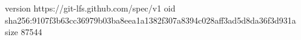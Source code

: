 version https://git-lfs.github.com/spec/v1
oid sha256:9107f3b63cc36979b03ba8eea1a1382f307a8394c028aff3ad5d8da36f3d931a
size 87544
